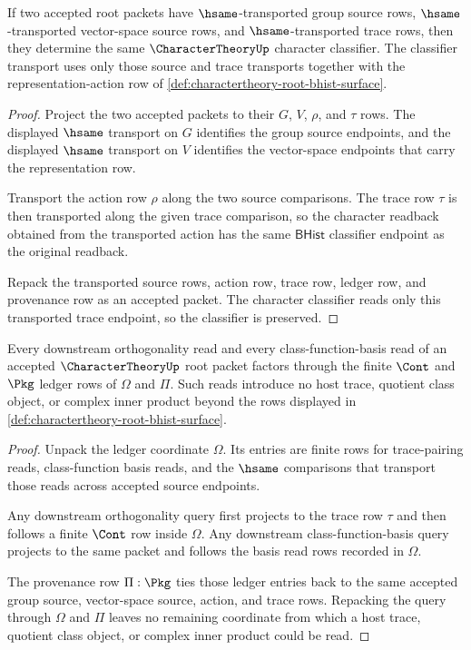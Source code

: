 \begin{theorem}
\label{thm:charactertheory-root-classifier-obligation}
If two accepted root packets have $\hsame$-transported group source rows, $\hsame$-transported vector-space source rows, and $\hsame$-transported trace rows, then they determine the same $\CharacterTheoryUp$ character classifier. The classifier transport uses only those source and trace transports together with the representation-action row of \autoref{def:charactertheory-root-bhist-surface}.
\end{theorem}
\begin{proof}
Project the two accepted packets to their $G$, $V$, $\rho$, and $\tau$ rows. The displayed $\hsame$ transport on $G$ identifies the group source endpoints, and the displayed $\hsame$ transport on $V$ identifies the vector-space endpoints that carry the representation row.

Transport the action row $\rho$ along the two source comparisons. The trace row $\tau$ is then transported along the given trace comparison, so the character readback obtained from the transported action has the same $\mathsf{BHist}$ classifier endpoint as the original readback.

Repack the transported source rows, action row, trace row, ledger row, and provenance row as an accepted packet. The character classifier reads only this transported trace endpoint, so the classifier is preserved.
\end{proof}

\begin{theorem}
\label{thm:charactertheory-root-ledger-obligation}
Every downstream orthogonality read and every class-function-basis read of an accepted $\CharacterTheoryUp$ root packet factors through the finite $\Cont$ and $\Pkg$ ledger rows of $\Omega$ and $\Pi$. Such reads introduce no host trace, quotient class object, or complex inner product beyond the rows displayed in \autoref{def:charactertheory-root-bhist-surface}.
\end{theorem}
\begin{proof}
Unpack the ledger coordinate $\Omega$. Its entries are finite rows for trace-pairing reads, class-function basis reads, and the $\hsame$ comparisons that transport those reads across accepted source endpoints.

Any downstream orthogonality query first projects to the trace row $\tau$ and then follows a finite $\Cont$ row inside $\Omega$. Any downstream class-function-basis query projects to the same packet and follows the basis read rows recorded in $\Omega$.

The provenance row $\Pi:\Pkg$ ties those ledger entries back to the same accepted group source, vector-space source, action, and trace rows. Repacking the query through $\Omega$ and $\Pi$ leaves no remaining coordinate from which a host trace, quotient class object, or complex inner product could be read.
\end{proof}

